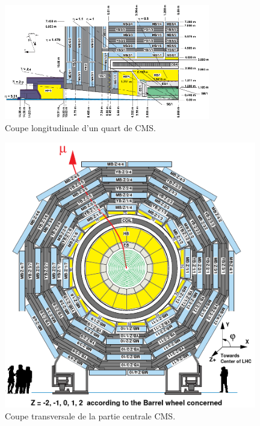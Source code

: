 \begin{figure}
\centering
\includegraphics[width=0.80\textwidth]{CMS/CMSLONG.png}
\captionsetup{type=figure}\caption{Coupe longitudinale d'un quart de CMS.}
\label{CMS1}
\end{figure}


\begin{figure}[p]
\centering
\includegraphics[width=0.98\textwidth]{CMS/CMSTRANS.png}
\captionsetup{type=figure}\caption{Coupe transversale de la partie centrale CMS.}
\label{CMS2}
\end{figure}

